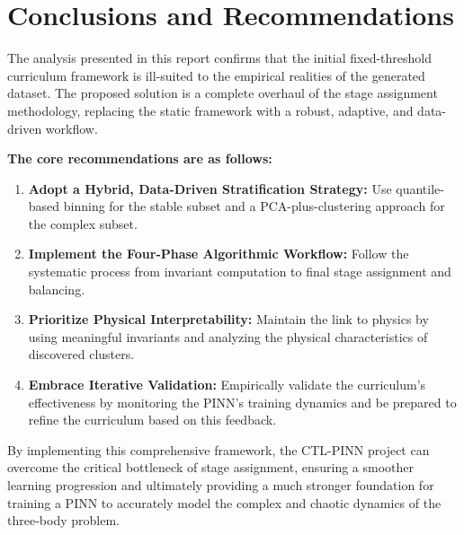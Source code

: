 \documentclass[11pt, letterpaper]{article}
\begin{document}
\part{Conclusions and Recommendations}

The analysis presented in this report confirms that the initial fixed-threshold curriculum framework is ill-suited to the empirical realities of the generated dataset. The proposed solution is a complete overhaul of the stage assignment methodology, replacing the static framework with a robust, adaptive, and data-driven workflow.

\textbf{The core recommendations are as follows:}
\begin{enumerate}
    \item \textbf{Adopt a Hybrid, Data-Driven Stratification Strategy:} Use quantile-based binning for the stable subset and a PCA-plus-clustering approach for the complex subset.
    \item \textbf{Implement the Four-Phase Algorithmic Workflow:} Follow the systematic process from invariant computation to final stage assignment and balancing.
    \item \textbf{Prioritize Physical Interpretability:} Maintain the link to physics by using meaningful invariants and analyzing the physical characteristics of discovered clusters.
    \item \textbf{Embrace Iterative Validation:} Empirically validate the curriculum's effectiveness by monitoring the PINN's training dynamics and be prepared to refine the curriculum based on this feedback.
\end{enumerate}
By implementing this comprehensive framework, the CTL-PINN project can overcome the critical bottleneck of stage assignment, ensuring a smoother learning progression and ultimately providing a much stronger foundation for training a PINN to accurately model the complex and chaotic dynamics of the three-body problem.
\end{document}
